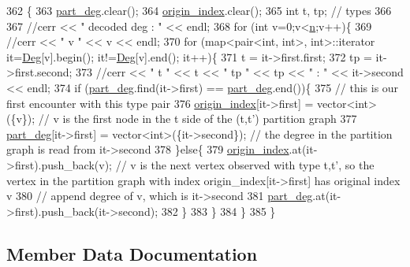 \begin{DoxyCode}
362 \{
363   \hyperlink{classmarked__graph__decoder_a6882e96fcad9abb10e72f1398814824a}{part\_deg}.clear();
364   \hyperlink{classmarked__graph__decoder_aab3e2f6d4376ba96da32f25aa9ddd069}{origin\_index}.clear();
365   \textcolor{keywordtype}{int} t, tp; \textcolor{comment}{// types}
366 
367   \textcolor{comment}{//cerr << " decoded deg : " << endl;}
368   \textcolor{keywordflow}{for} (\textcolor{keywordtype}{int} v=0;v<\hyperlink{classmarked__graph__decoder_aefc93611bc4a3e9a5d3956d97649a0e9}{n};v++)\{
369     \textcolor{comment}{//cerr << " v " << v << endl;}
370     \textcolor{keywordflow}{for} (map<pair<int, int>, \textcolor{keywordtype}{int}>::iterator it=\hyperlink{classmarked__graph__decoder_a5040ad86467693eab415f615408bfb9e}{Deg}[v].begin(); it!=\hyperlink{classmarked__graph__decoder_a5040ad86467693eab415f615408bfb9e}{Deg}[v].end(); it++)\{
371       t = it->first.first;
372       tp = it->first.second;
373       \textcolor{comment}{//cerr << " t " << t << " tp " << tp << " : " << it->second << endl;}
374       \textcolor{keywordflow}{if} (\hyperlink{classmarked__graph__decoder_a6882e96fcad9abb10e72f1398814824a}{part\_deg}.find(it->first) == \hyperlink{classmarked__graph__decoder_a6882e96fcad9abb10e72f1398814824a}{part\_deg}.end())\{
375         \textcolor{comment}{// this is our first encounter with this type pair}
376         \hyperlink{classmarked__graph__decoder_aab3e2f6d4376ba96da32f25aa9ddd069}{origin\_index}[it->first] = vector<int>(\{v\}); \textcolor{comment}{// v is the first node in the t side of the
       (t,t') partition graph}
377         \hyperlink{classmarked__graph__decoder_a6882e96fcad9abb10e72f1398814824a}{part\_deg}[it->first] = vector<int>(\{it->second\}); \textcolor{comment}{// the degree in the partition graph is
       read from it->second}
378       \}\textcolor{keywordflow}{else}\{
379         \hyperlink{classmarked__graph__decoder_aab3e2f6d4376ba96da32f25aa9ddd069}{origin\_index}.at(it->first).push\_back(v); \textcolor{comment}{// v is the next vertex observed with type
       t,t', so the vertex in the partition graph with index origin\_index[it->first] has original index v }
380         \textcolor{comment}{// append degree of v, which is it->second}
381         \hyperlink{classmarked__graph__decoder_a6882e96fcad9abb10e72f1398814824a}{part\_deg}.at(it->first).push\_back(it->second);
382       \}
383     \}
384   \}
385 \}
\end{DoxyCode}


\subsection{Member Data Documentation}
\mbox{\label{classmarked__graph__decoder_a5040ad86467693eab415f615408bfb9e}} 
